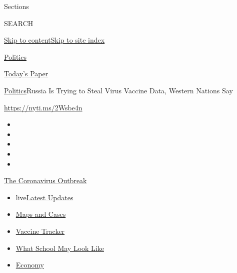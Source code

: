 Sections

SEARCH

\protect\hyperlink{site-content}{Skip to
content}\protect\hyperlink{site-index}{Skip to site index}

\href{https://www.nytimes.com/section/politics}{Politics}

\href{https://myaccount.nytimes.com/auth/login?response_type=cookie\&client_id=vi}{}

\href{https://www.nytimes.com/section/todayspaper}{Today's Paper}

\href{/section/politics}{Politics}\textbar{}Russia Is Trying to Steal
Virus Vaccine Data, Western Nations Say

\url{https://nyti.ms/2Wsbe4n}

\begin{itemize}
\item
\item
\item
\item
\item
\end{itemize}

\href{https://www.nytimes.com/news-event/coronavirus?action=click\&pgtype=Article\&state=default\&region=TOP_BANNER\&context=storylines_menu}{The
Coronavirus Outbreak}

\begin{itemize}
\tightlist
\item
  live\href{https://www.nytimes.com/2020/08/01/world/coronavirus-covid-19.html?action=click\&pgtype=Article\&state=default\&region=TOP_BANNER\&context=storylines_menu}{Latest
  Updates}
\item
  \href{https://www.nytimes.com/interactive/2020/us/coronavirus-us-cases.html?action=click\&pgtype=Article\&state=default\&region=TOP_BANNER\&context=storylines_menu}{Maps
  and Cases}
\item
  \href{https://www.nytimes.com/interactive/2020/science/coronavirus-vaccine-tracker.html?action=click\&pgtype=Article\&state=default\&region=TOP_BANNER\&context=storylines_menu}{Vaccine
  Tracker}
\item
  \href{https://www.nytimes.com/interactive/2020/07/29/us/schools-reopening-coronavirus.html?action=click\&pgtype=Article\&state=default\&region=TOP_BANNER\&context=storylines_menu}{What
  School May Look Like}
\item
  \href{https://www.nytimes.com/live/2020/07/31/business/stock-market-today-coronavirus?action=click\&pgtype=Article\&state=default\&region=TOP_BANNER\&context=storylines_menu}{Economy}
\end{itemize}

